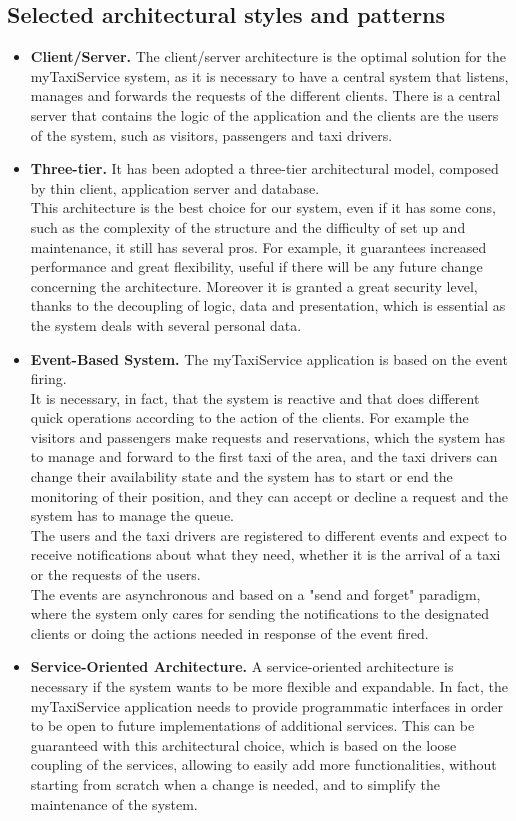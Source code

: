 		\subsection{Selected architectural styles and patterns}
		\begin{itemize}
			\item \textbf{Client/Server.} The client/server architecture is the optimal solution for the myTaxiService system, as it is necessary to have a central system that listens, manages and forwards the requests of the different clients. There is a central server that contains the logic of the application and the clients are the users of the system, such as visitors, passengers and taxi drivers.
			\item \textbf{Three-tier.} It has been adopted a three-tier architectural model, composed by thin client, application server and database.\\ This architecture is the best choice for our system, even if it has some cons, such as the complexity of the structure and the difficulty of set up and maintenance, it still has several pros. For example, it guarantees increased performance and great flexibility, useful if there will be any future change concerning the architecture. Moreover it is granted a great security level, thanks to the decoupling of logic, data and presentation, which is essential as the system deals with several personal data.
			\item \textbf{Event-Based System.} The myTaxiService application is based on the event firing. \\It is necessary, in fact, that the system is reactive and that does different quick operations according to the action of the clients. For example the visitors and passengers make requests and reservations, which the system has to manage and forward to the first taxi of the area, and the taxi drivers can change their availability state and the system has to start or end the monitoring of their position, and they can accept or decline a request and the system has to manage the queue. \\The users and the taxi drivers are registered to different events and expect to receive notifications about what they need, whether it is the arrival of a taxi or the requests of the users.\\ The events are asynchronous and based on a "send and forget" paradigm, where the system only cares for sending the notifications to the designated clients or doing the actions needed in response of the event fired.
			\item  \textbf{Service-Oriented Architecture.} A service-oriented architecture is necessary if the system wants to be more flexible and expandable. In fact, the myTaxiService application needs to provide programmatic interfaces in order to be open to future implementations of additional services. This can be guaranteed with this architectural choice, which is based on the loose coupling of the services, allowing to easily add more functionalities, without starting from scratch when a change is needed, and to simplify the maintenance of the system.
		\end{itemize}
							
%